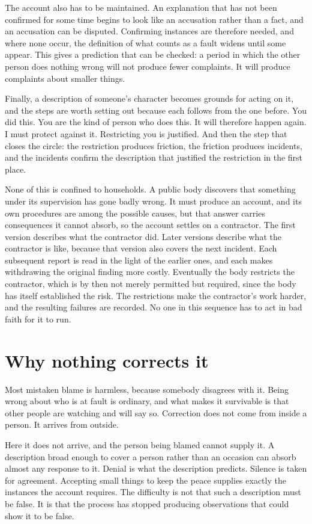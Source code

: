\documentclass{article}
\begin{document}
The account also has to be maintained. An explanation that has not been confirmed for some time begins to look like an accusation rather than a fact, and an accusation can be disputed. Confirming instances are therefore needed, and where none occur, the definition of what counts as a fault widens until some appear. This gives a prediction that can be checked: a period in which the other person does nothing wrong will not produce fewer complaints. It will produce complaints about smaller things.

Finally, a description of someone's character becomes grounds for acting on it, and the steps are worth setting out because each follows from the one before. You did this. You are the kind of person who does this. It will therefore happen again. I must protect against it. Restricting you is justified. And then the step that closes the circle: the restriction produces friction, the friction produces incidents, and the incidents confirm the description that justified the restriction in the first place.

None of this is confined to households. A public body discovers that something under its supervision has gone badly wrong. It must produce an account, and its own procedures are among the possible causes, but that answer carries consequences it cannot absorb, so the account settles on a contractor. The first version describes what the contractor did. Later versions describe what the contractor is like, because that version also covers the next incident. Each subsequent report is read in the light of the earlier ones, and each makes withdrawing the original finding more costly. Eventually the body restricts the contractor, which is by then not merely permitted but required, since the body has itself established the risk. The restrictions make the contractor's work harder, and the resulting failures are recorded. No one in this sequence has to act in bad faith for it to run.

\section{Why nothing corrects it}
Most mistaken blame is harmless, because somebody disagrees with it. Being wrong about who is at fault is ordinary, and what makes it survivable is that other people are watching and will say so. Correction does not come from inside a person. It arrives from outside.

Here it does not arrive, and the person being blamed cannot supply it. A description broad enough to cover a person rather than an occasion can absorb almost any response to it. Denial is what the description predicts. Silence is taken for agreement. Accepting small things to keep the peace supplies exactly the instances the account requires. The difficulty is not that such a description must be false. It is that the process has stopped producing observations that could show it to be false.
\end{document}
